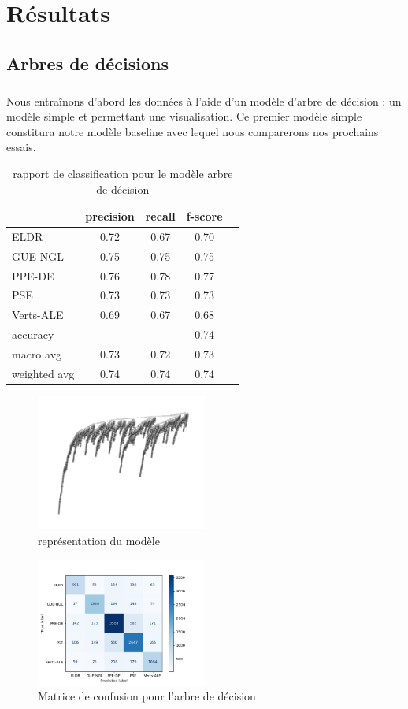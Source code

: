 \documentclass[11pt]{article}
\begin{document}
\section{Résultats}

\subsection{Arbres de décisions}

\subparagraph{}
Nous entraînons d'abord les données à l'aide d'un modèle d'arbre de décision : un modèle simple et permettant une visualisation. Ce premier modèle simple constitura notre modèle baseline avec lequel nous comparerons nos prochains essais.

\begin{table}[h]
\centering
\begin{tabular}{lcccc}
\hline
 & precision & recall & f-score\\
\hline
ELDR & 0.72 & 0.67 & 0.70 \\
GUE-NGL & 0.75 & 0.75 & 0.75\\
PPE-DE & 0.76 & 0.78 & 0.77\\ 
PSE &  0.73 & 0.73 & 0.73 \\ 
Verts-ALE & 0.69 & 0.67 & 0.68\\
\hline
accuracy& & & 0.74 \\
macro avg & 0.73 & 0.72 & 0.73\\
weighted avg & 0.74 & 0.74 & 0.74\\
\hline
\end{tabular}
\caption{rapport de classification pour le modèle arbre de décision}
\end{table}

\begin{figure}[h]
\includegraphics[width=0.5\textwidth]{decision_tree}
\caption{représentation du modèle}
\centering
\end{figure}

\begin{figure}[h]
\includegraphics[width=0.5\textwidth]{MatriceConfusionTree}
\caption{Matrice de confusion pour l'arbre de décision}
\centering
\end{figure}
\end{document}
